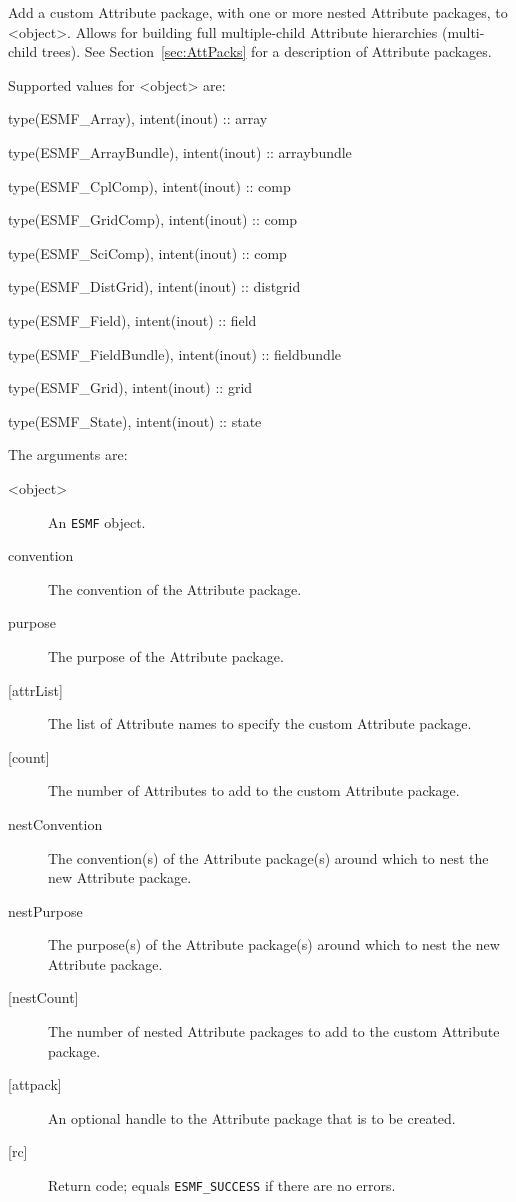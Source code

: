    Add a custom Attribute package, with one or more nested Attribute
   packages, to <object>. Allows for building full multiple-child Attribute
   hierarchies (multi-child trees).
   See Section~\ref{sec:AttPacks} for a description of Attribute packages.
  
   Supported values for <object> are:
   \begin{description}
   \item type(ESMF\_Array), intent(inout) :: array
   \item type(ESMF\_ArrayBundle), intent(inout) :: arraybundle
   \item type(ESMF\_CplComp), intent(inout) :: comp
   \item type(ESMF\_GridComp), intent(inout) :: comp
   \item type(ESMF\_SciComp), intent(inout) :: comp
   \item type(ESMF\_DistGrid), intent(inout) :: distgrid
   \item type(ESMF\_Field), intent(inout) :: field
   \item type(ESMF\_FieldBundle), intent(inout) :: fieldbundle
   \item type(ESMF\_Grid), intent(inout) :: grid
   \item type(ESMF\_State), intent(inout) :: state
   \end{description}
  
   The arguments are:
   \begin{description}
   \item [<object>]
   An {\tt ESMF} object.
   \item [convention]
   The convention of the Attribute package.
   \item [purpose]
   The purpose of the Attribute package.
   \item [{[attrList]}]
   The list of Attribute names to specify the custom Attribute package.
   \item [{[count]}]
   The number of Attributes to add to the custom Attribute package.
   \item [nestConvention]
   The convention(s) of the Attribute package(s) around which to nest
   the new Attribute package.
   \item [nestPurpose]
   The purpose(s) of the Attribute package(s) around which to nest the
   new Attribute package.
   \item [{[nestCount]}]
   The number of nested Attribute packages to add to the custom
   Attribute package.
   \item [{[attpack]}]
   An optional handle to the Attribute package that is to be created.
   \item [{[rc]}]
   Return code; equals {\tt ESMF\_SUCCESS} if there are no errors.
   \end{description}
  
